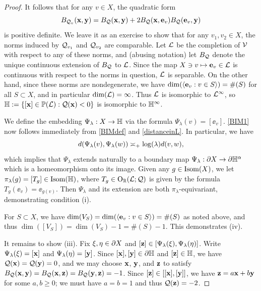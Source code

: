 \begin{proof}
It follows that for any $v\in X$, the quadratic form
\[
B_{\mathcal Q_v}(\mathbf x,\mathbf y) = B_\mathcal Q(\mathbf x,\mathbf y) + 2B_\mathcal Q(\mathbf x,\mathbf e_v) B_\mathcal Q(\mathbf e_v,\mathbf y)
\]
is positive definite. We leave it as an exercise to show that for any $v_1,v_2\in X$, the norms induced by $\mathcal Q_{v_1}$ and $\mathcal Q_{v_2}$ are comparable. Let $\mathcal L$ be the completion of $\mathcal V$ with respect to any of these norms, and (abusing notation) let $B_\mathcal Q$ denote the unique continuous extension of $B_\mathcal Q$ to $\mathcal L$. Since the map $X\ni v\mapsto \mathbf e_v\in \mathcal L$ is continuous with respect to the norms in question, $\mathcal L$ is separable. On the other hand, since these norms are nondegenerate, we have $\dim(\langle \mathbf e_v : v\in S\rangle) = \#(S)$ for all $S\subset X$, and in particular $\dim(\mathcal L) = \infty$. Thus $\mathcal L$ is isomorphic to $\mathcal L^\infty$, so $\H := \{[\xx]\in \proj(\LL) : \QQ(\xx) < 0\}$ is isomorphic to $\H^\infty$.

We define the embedding $\Psi_\lambda:X\to\H$ via the formula $\Psi_\lambda(v) = [\ee_v]$. \eqref{BIM1} now follows immediately from \eqref{BIMdef} and \eqref{distanceinL}. In particular, we have 
\[
d(\Psi_\lambda(v),\Psi_\lambda(w)) \asymp_+ \log(\lambda) d(v,w), 
\]
which implies that $\Psi_\lambda$ extends naturally to a boundary map $\Psi_\lambda:\del X\to \del\H^\alpha$ which is a homeomorphism onto its image. Given any $g\in\operatorname{Isom}(X)$, we let $\pi_\lambda(g) = [T_g]\in\Isom(\H)$, where $T_g\in \O_\R(\LL;\QQ)$ is given by the formula $T_g(\ee_v) = \ee_{g(v)}$. Then $\Psi_\lambda$ and its extension are both $\pi_\lambda$-equivariant, demonstrating condition (i).

For $S\subset X$, we have $\dim(V_S) = \dim(\langle \mathbf e_v : v\in S\rangle) = \#(S)$ as noted above, and thus $\dim([V_S]) = \dim(V_S) - 1 = \#(S) - 1$. This demonstrates (iv).

It remains to show (iii). Fix $\xi,\eta\in\partial X$ and $[\mathbf z]\in[\Psi_\lambda(\xi),\Psi_\lambda(\eta)]$. Write $\Psi_\lambda(\xi) = [\mathbf x]$ and $\Psi_\lambda(\eta) = [\mathbf y]$. Since $[\xx],[\yy]\in\del\H$ and $[\zz]\in\H$, we have $\mathcal Q(\mathbf x) = \mathcal Q(\mathbf y) = 0$, and we may choose $\mathbf x$, $\mathbf y$, and $\mathbf z$ to satisfy $B_\mathcal Q(\mathbf x,\mathbf y) = B_\mathcal Q(\mathbf x,\mathbf z) = B_\mathcal Q(\mathbf y,\mathbf z) = -1$. Since $[\mathbf z]\in[[\mathbf x],[\mathbf y]]$, we have $\mathbf z = a\mathbf x + b\mathbf y$ for some $a,b \geq 0$; we must have $a = b = 1$ and thus $\mathcal Q(\mathbf z) = -2$.


\end{proof}

